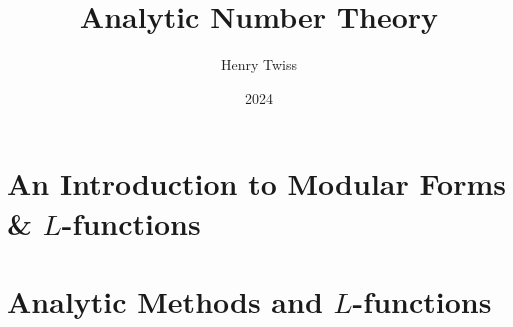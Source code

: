\documentclass[12pt,oneside]{book}
\title{Analytic Number Theory}
\author{Henry Twiss}
\date{2024}
\begin{document}
\maketitle
\pagestyle{empty}
\tableofcontents
\setcounter{page}{0}

\part{An Introduction to Modular Forms \& \texorpdfstring{$L$}{L}-functions}
  \pagestyle{fancy}
  
  
  
  

\part{Analytic Methods and \texorpdfstring{$L$}{L}-functions}
  
  
  
  




\printindex


\end{document}
